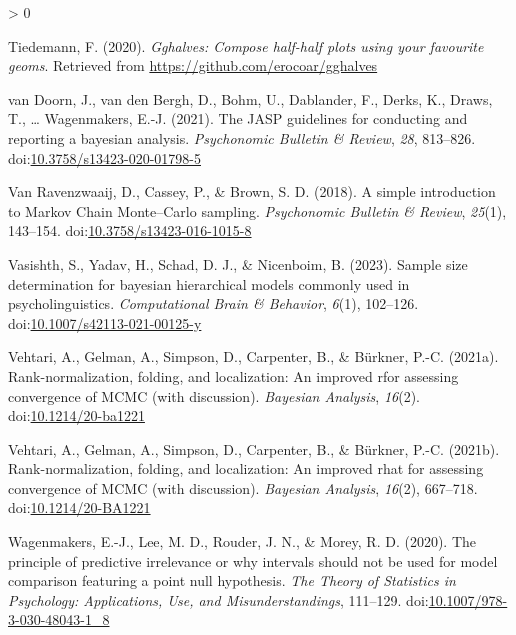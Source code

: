 \documentclass[
  english,
  doc,floatsintext]{apa6}
\newlength{\cslhangindent}
\newenvironment{CSLReferences}[2] %
 {%
  \setlength{\parindent}{0pt}
  \ifodd #1 \everypar{\setlength{\hangindent}{\cslhangindent}}\ignorespaces\fi
  \ifnum #2 > 0
  \setlength{\parskip}{#2\baselineskip}
  \fi
 }%
 {}
\begin{document}
\begin{CSLReferences}{1}{0}
\leavevmode\hypertarget{ref-R-gghalves}{}%
Tiedemann, F. (2020). \emph{Gghalves: Compose half-half plots using your favourite geoms}. Retrieved from \url{https://github.com/erocoar/gghalves}

\leavevmode\hypertarget{ref-van2019jasp}{}%
van Doorn, J., van den Bergh, D., Bohm, U., Dablander, F., Derks, K., Draws, T., \ldots{} Wagenmakers, E.-J. (2021). The JASP guidelines for conducting and reporting a bayesian analysis. \emph{Psychonomic Bulletin \& Review}, \emph{28}, 813--826. doi:\href{https://doi.org/10.3758/s13423-020-01798-5}{10.3758/s13423-020-01798-5}

\leavevmode\hypertarget{ref-van2018simple}{}%
Van Ravenzwaaij, D., Cassey, P., \& Brown, S. D. (2018). A simple introduction to {Markov Chain Monte--Carlo} sampling. \emph{Psychonomic Bulletin \& Review}, \emph{25}(1), 143--154. doi:\href{https://doi.org/10.3758/s13423-016-1015-8}{10.3758/s13423-016-1015-8}

\leavevmode\hypertarget{ref-vasishth2021sample}{}%
Vasishth, S., Yadav, H., Schad, D. J., \& Nicenboim, B. (2023). Sample size determination for bayesian hierarchical models commonly used in psycholinguistics. \emph{Computational Brain \& Behavior}, \emph{6}(1), 102--126. doi:\href{https://doi.org/10.1007/s42113-021-00125-y}{10.1007/s42113-021-00125-y}

\leavevmode\hypertarget{ref-Vehtari_2021}{}%
Vehtari, A., Gelman, A., Simpson, D., Carpenter, B., \& Bürkner, P.-C. (2021a). Rank-normalization, folding, and localization: An improved r{}for assessing convergence of MCMC (with discussion). \emph{Bayesian Analysis}, \emph{16}(2). doi:\href{https://doi.org/10.1214/20-ba1221}{10.1214/20-ba1221}

\leavevmode\hypertarget{ref-vehtari2019rank}{}%
Vehtari, A., Gelman, A., Simpson, D., Carpenter, B., \& Bürkner, P.-C. (2021b). Rank-normalization, folding, and localization: An improved rhat for assessing convergence of MCMC (with discussion). \emph{Bayesian Analysis}, \emph{16}(2), 667--718. doi:\href{https://doi.org/10.1214/20-BA1221}{10.1214/20-BA1221}

\leavevmode\hypertarget{ref-wagenmakers2020principle}{}%
Wagenmakers, E.-J., Lee, M. D., Rouder, J. N., \& Morey, R. D. (2020). The principle of predictive irrelevance or why intervals should not be used for model comparison featuring a point null hypothesis. \emph{The Theory of Statistics in Psychology: Applications, Use, and Misunderstandings}, 111--129. doi:\href{https://doi.org/10.1007/978-3-030-48043-1_8}{10.1007/978-3-030-48043-1\_8}


\end{CSLReferences}
\end{document}

